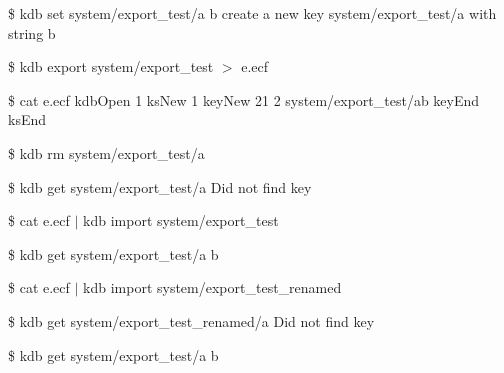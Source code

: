 \$ kdb set system/export\+\_\+test/a b create a new key system/export\+\_\+test/a with string b

\$ kdb export system/export\+\_\+test $>$ e.\+ecf

\$ cat e.\+ecf kdb\+Open 1 ks\+New 1 key\+New 21 2 system/export\+\_\+test/ab key\+End ks\+End

\$ kdb rm system/export\+\_\+test/a

\$ kdb get system/export\+\_\+test/a Did not find key

\$ cat e.\+ecf $\vert$ kdb import system/export\+\_\+test

\$ kdb get system/export\+\_\+test/a b

\$ cat e.\+ecf $\vert$ kdb import system/export\+\_\+test\+\_\+renamed

\$ kdb get system/export\+\_\+test\+\_\+renamed/a Did not find key

\$ kdb get system/export\+\_\+test/a b 